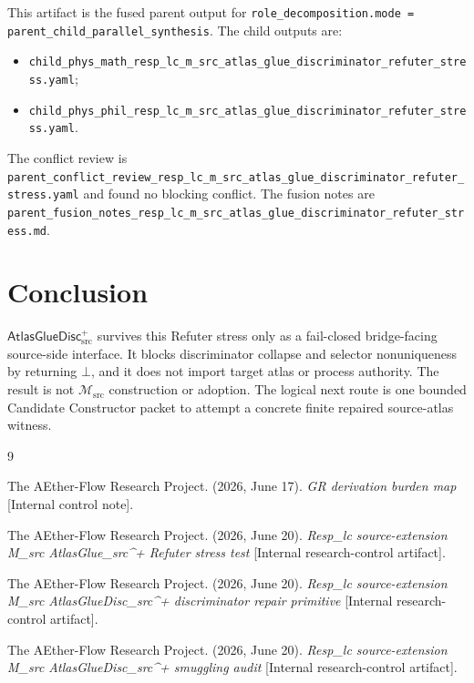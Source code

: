 \documentclass[11pt]{article}
\newcommand{\Msrc}{\mathcal{M}_{\mathrm{src}}}
\newcommand{\AtlasGlueDisc}{\mathsf{AtlasGlueDisc}_{\mathrm{src}}^{+}}
\begin{document}
This artifact is the fused parent output for
\texttt{role\_decomposition.mode = parent\_child\_parallel\_synthesis}. The
child outputs are:
\begin{itemize}
  \item \texttt{child\_phys\_math\_resp\_lc\_m\_src\_atlas\_glue\_discriminator\_refuter\_stress.yaml};
  \item \texttt{child\_phys\_phil\_resp\_lc\_m\_src\_atlas\_glue\_discriminator\_refuter\_stress.yaml}.
\end{itemize}
The conflict review is
\texttt{parent\_conflict\_review\_resp\_lc\_m\_src\_atlas\_glue\_discriminator\_refuter\_stress.yaml}
and found no blocking conflict. The fusion notes are
\texttt{parent\_fusion\_notes\_resp\_lc\_m\_src\_atlas\_glue\_discriminator\_refuter\_stress.md}.

\section{Conclusion}

\(\AtlasGlueDisc\) survives this Refuter stress only as a fail-closed
bridge-facing source-side interface. It blocks discriminator collapse and
selector nonuniqueness by returning \(\bot\), and it does not import target
atlas or process authority. The result is not \(\Msrc\) construction or
adoption. The logical next route is one bounded Candidate Constructor packet
to attempt a concrete finite repaired source-atlas witness.

\begin{thebibliography}{9}

The AEther-Flow Research Project. (2026, June 17). \emph{GR derivation burden
map} [Internal control note].

The AEther-Flow Research Project. (2026, June 20). \emph{Resp\_lc
source-extension M\_src AtlasGlue\_src\^{}+ Refuter stress test} [Internal
research-control artifact].

The AEther-Flow Research Project. (2026, June 20). \emph{Resp\_lc
source-extension M\_src AtlasGlueDisc\_src\^{}+ discriminator repair
primitive} [Internal research-control artifact].

The AEther-Flow Research Project. (2026, June 20). \emph{Resp\_lc
source-extension M\_src AtlasGlueDisc\_src\^{}+ smuggling audit} [Internal
research-control artifact].

\end{thebibliography}
\end{document}
